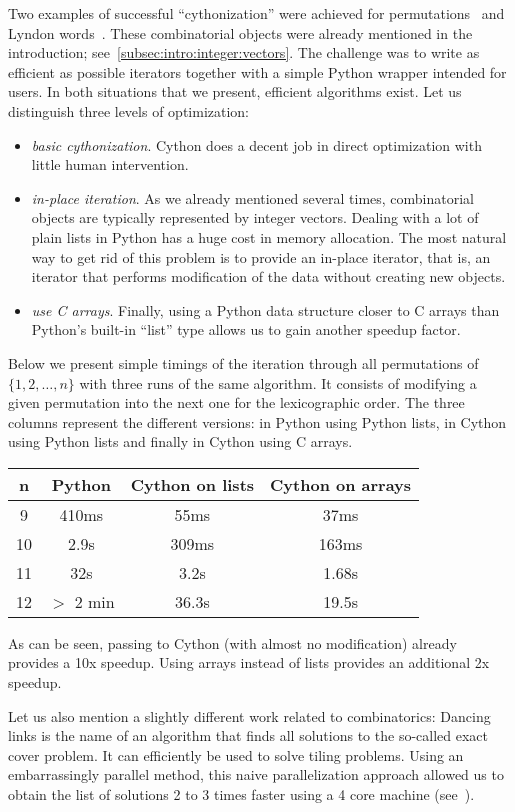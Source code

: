 \documentclass{deliverablereport}
\begin{document}
Two examples of successful ``cythonization'' were achieved for
permutations~\cite{trac-23734} and Lyndon words~\cite{trac-26111}.
These combinatorial objects were already mentioned in the
introduction; see~\ref{subsec:intro:integer:vectors}.
The challenge was to write as efficient as possible iterators
together with a simple Python wrapper intended for \Sage users.
In both situations that we present, efficient algorithms exist.
Let us distinguish three levels of optimization:
\begin{itemize}
\item \textit{basic cythonization}. Cython does a decent job in
direct optimization with little human intervention. 
\item \textit{in-place iteration}. As we already mentioned several
times, combinatorial objects are typically represented by
integer vectors. Dealing with a lot of plain lists in Python has a huge
cost in memory allocation. The most natural way to get rid of
this problem is to provide an in-place iterator, that is, an iterator that performs
modification of the data without creating new objects.
\item \textit{use C arrays}. Finally, using a Python data structure closer to C
arrays than Python's built-in ``list'' type allows us to gain another speedup factor.
\end{itemize}
Below we present simple timings of the iteration through all permutations
of $\{1, 2, \ldots, n\}$ with three runs of the same algorithm. It consists
of modifying a given permutation into the next one for the lexicographic
order. The three columns represent the different versions: in Python
using Python lists, in Cython using Python lists and finally in Cython
using C arrays.
\begin{center}\begin{tabular}{c|c|c|c}
n & Python & Cython on lists & Cython on arrays \\
\hline
9  & 410ms   & 55ms  & 37ms \\
10 & 2.9s    & 309ms & 163ms \\
11 & 32s     & 3.2s  & 1.68s \\
12 & $>$ 2 min & 36.3s & 19.5s \\
\end{tabular}\end{center}
As can be seen, passing to Cython (with almost no modification) already
provides a 10x speedup. Using arrays instead of lists provides an
additional 2x speedup.

Let us also mention a slightly different work related to combinatorics:
Dancing links is the name of an algorithm that finds all solutions to
the so-called exact cover problem. It can efficiently be used to
solve tiling problems. Using an embarrassingly parallel method,
this naive parallelization approach allowed us to obtain the list
of solutions 2 to 3 times faster using a 4 core machine
(see~\cite{trac-25125}).
\end{document}
